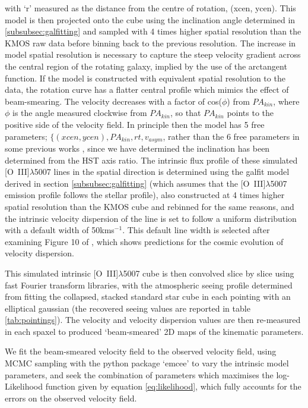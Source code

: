 \documentclass[fleqn,usenatbib]{mn2e}
\begin{document}
\noindent
with `r' measured as the distance from the centre of rotation, (xcen, ycen).
This model is then projected onto the cube using the inclination angle determined in \cref{subsubsec:galfitting} and sampled with 4 times higher spatial resolution than the KMOS raw data before binning back to the previous resolution.
The increase in model spatial resolution is necessary to capture the steep velocity gradient across the central region of the rotating galaxy, implied by the use of the arctangent function.
If the model is constructed with equivalent spatial resolution to the data, the rotation curve has a flatter central profile which mimics the effect of beam-smearing.
The velocity decreases with a factor of cos($\phi$) from $PA_{kin}$, where $\phi$ is the angle measured clockwise from $PA_{kin}$, so that $PA_{kin}$ points to the positive side of the velocity field.
In principle then the model has 5 free parameters; $\{(xcen, ycen), PA_{kin}, rt, v_{asym}$, rather than the 6 free parameters in some previous works \citep[e.g.][]{Stott2016}, since we have determined the inclination has been determined from the HST axis ratio.
The intrinsic flux profile of these simulated [O~{\sc III}]$\lambda$5007 lines in the spatial direction is determined using the galfit model derived in section \cref{subsubsec:galfitting} (which assumes that the [O~{\sc III}]$\lambda$5007 emission profile follows the stellar profile), also constructed at 4 times higher spatial resolution than the KMOS cube and rebinned for the same reasons, and the intrinsic velocity dispersion of the line is set to follow a uniform distribution with a default width of 50kms$^{-1}$.
This default line width is selected after examining Figure 10 of \cite{Wisnioski2015}, which shows predictions for the cosmic evolution of velocity dispersion.

This simulated intrinsic [O~{\sc III}]$\lambda$5007 cube is then convolved slice by slice using fast Fourier transform libraries, with the atmospheric seeing profile determined from fitting the collapsed, stacked standard star cube in each pointing with an elliptical gaussian (the recovered seeing values are reported in table \ref{tab:pointings}).
The velocity and velocity dispersion values are then re-measured in each spaxel to produced `beam-smeared' 2D maps of the kinematic parameters.

We fit the beam-smeared velocity field to the observed velocity field, using MCMC sampling with the python package `emcee' \citep{Foreman-Mackey2013} to vary the intrinsic model parameters, and seek the combination of parameters which maximises the log-Likelihood function given by equation \ref{eq:likelihood}, which fully accounts for the errors on the observed velocity field.
\end{document}
